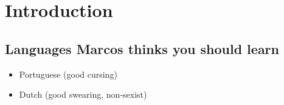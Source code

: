 \chapter{Introduction}
\section{Languages Marcos thinks you should learn}
\begin{itemize}
    \item Portuguese (good cursing)
    \item Dutch (good swearing, non-sexist)
\end{itemize}
